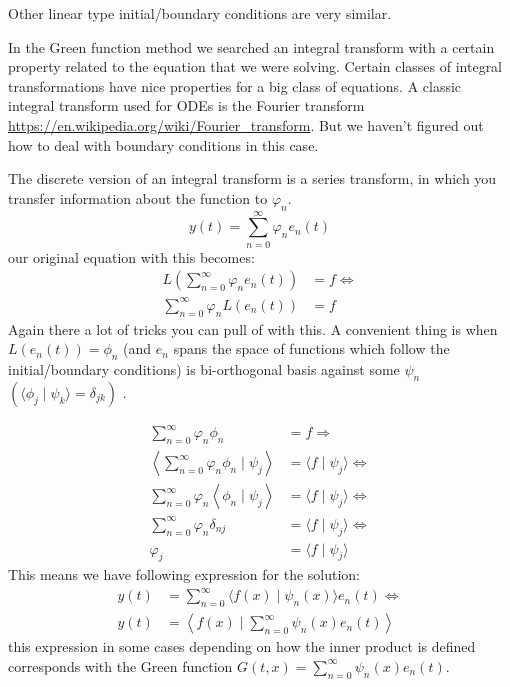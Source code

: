 \documentclass[a4paper,12pt]{article}
\begin{document}
Other linear type initial/boundary conditions are very similar.

In the Green function method we searched an integral transform with a certain property
related to the equation that we were solving. Certain classes of integral
transformations have nice properties for a big class of equations.
A classic integral transform used for ODEs is the Fourier transform
\url{https://en.wikipedia.org/wiki/Fourier_transform}.
But we haven't figured
out how to deal with boundary conditions in this case.

The discrete version of an integral transform is a series transform,
in which you transfer information about the function to $\varphi_n$.
$$
    y(t) = \sum_{n=0}^{\infty} \varphi_n e_n(t)
$$
our original equation with this becomes:
\begin{align*}
    L \left(\sum_{n=0}^{\infty} \varphi_n e_n(t) \right) & = f \Leftrightarrow \\
    \sum_{n=0}^{\infty} \varphi_n L (e_n(t))             & = f
\end{align*}
Again there a lot of tricks you can pull of with this.
A convenient thing is when $L(e_{n}(t)) = \phi_{n}$ (and $e_{n}$
spans the space of functions which follow the initial/boundary conditions)
is bi-orthogonal basis against some $\psi_n$
$\left(\langle \phi_j \mid \psi_{k} \rangle= \delta_{jk}\right)$ .

\begin{align*}
    \sum_{n=0}^{\infty} \varphi_n \phi_{n}                                            & = f \Rightarrow                                   \\
    \left \langle \sum_{n=0}^{\infty} \varphi_n \phi_{n}\mid \psi_{j}  \right \rangle & =  \langle f\mid \psi_{j} \rangle \Leftrightarrow \\
    \sum_{n=0}^{\infty} \varphi_n \left \langle \phi_{n}\mid \psi_{j}  \right \rangle & =  \langle f\mid \psi_{j} \rangle \Leftrightarrow \\
    \sum_{n=0}^{\infty} \varphi_n \delta_{nj}                                         & =  \langle f\mid \psi_{j} \rangle \Leftrightarrow \\
    \varphi_j                                                                         & =  \langle f\mid \psi_{j} \rangle
\end{align*}
This means we have following expression for the solution:
\begin{align*}
    y(t) & = \sum_{n=0}^{\infty} \langle f(x)\mid \psi_{n}(x) \rangle e_{n}(t)  \Leftrightarrow \\
    y(t) & = \left\langle f(x)\mid  \sum_{n=0}^{\infty} \psi_{n}(x)e_{n}(t)  \right \rangle
\end{align*}
this expression in some cases depending on how the inner product is defined corresponds
with the Green function $G(t,x) =\sum_{n=0}^{\infty} \psi_{n}(x)e_{n}(t)$.
\end{document}
